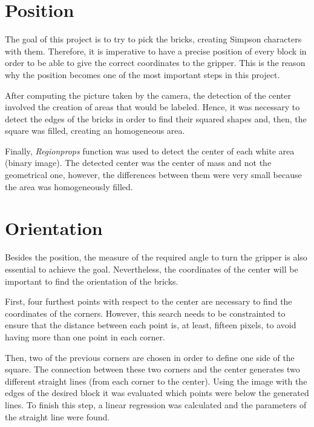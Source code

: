 \section{Position}
The goal of this project is to try to pick the bricks, creating Simpson characters with them. Therefore, it is imperative to have a precise position of every block in order to be able to give the correct coordinates to the gripper. This is the reason why the position becomes one of the most important steps in this project.

After computing the picture taken by the camera, the detection of the center involved the creation of areas that would be labeled. Hence, it was necessary to detect the edges of the bricks in order to find their squared shapes and, then, the square was filled, creating an homogeneous area.

Finally, \textit{Regionprops} function was used to detect the center of each white area (binary image). The detected center was the center of mass and not the geometrical one, however, the differences between them were very small because the area was homogeneously filled.


\section{Orientation}
Besides the position, the measure of the required angle to turn the gripper is also essential to achieve the goal. Nevertheless, the coordinates of the center will be important to find the orientation of the bricks. 

First, four furthest points with respect to the center are necessary to find the coordinates of the corners. However, this search needs to be constrainted to ensure that the distance between each point is, at least, fifteen pixels, to avoid having more than one point in each corner.

Then, two of the previous corners are chosen in order to define one side of the square. The connection between these two corners and the center generates two different straight lines (from each corner to the center). Using the image with the edges of the desired block it was evaluated which points were below the generated lines. To finish this step, a linear regression was calculated and the parameters of the straight line were found.

